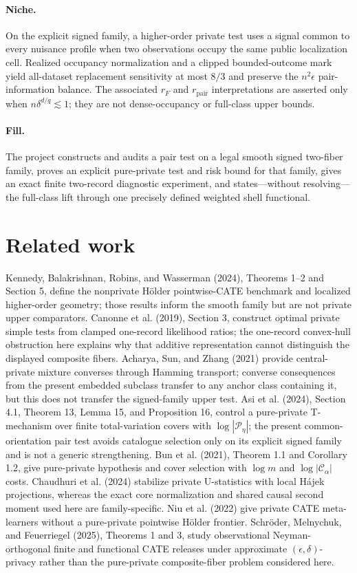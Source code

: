 \documentclass{article}
\begin{document}
\paragraph{Niche.} On the explicit signed family, a higher-order private test uses a signal common to every nuisance profile when two observations occupy the same public localization cell. Realized occupancy normalization and a clipped bounded-outcome mark yield all-dataset replacement sensitivity at most \(8/3\) and preserve the \(n^2\epsilon\) pair-information balance. The associated \(r_F\) and \(r_{\mathrm{pair}}\) interpretations are asserted only when \(n\delta^{d/q}\lesssim1\); they are not dense-occupancy or full-class upper bounds.

\paragraph{Fill.} The project constructs and audits a pair test on a legal smooth signed two-fiber family, proves an explicit pure-private test and risk bound for that family, gives an exact finite two-record diagnostic experiment, and states—without resolving—the full-class lift through one precisely defined weighted shell functional.

\section{Related work}

Kennedy, Balakrishnan, Robins, and Wasserman (2024), Theorems 1--2 and Section 5, define the nonprivate Hölder pointwise-CATE benchmark and localized higher-order geometry; those results inform the smooth family but are not private upper comparators. Canonne et al. (2019), Section 3, construct optimal private simple tests from clamped one-record likelihood ratios; the one-record convex-hull obstruction here explains why that additive representation cannot distinguish the displayed composite fibers. Acharya, Sun, and Zhang (2021) provide central-private mixture converses through Hamming transport; converse consequences from the present embedded subclass transfer to any anchor class containing it, but this does not transfer the signed-family upper test. Asi et al. (2024), Section 4.1, Theorem 13, Lemma 15, and Proposition 16, control a pure-private T-mechanism over finite total-variation covers with \(\log|\mathcal P_\eta|\); the present common-orientation pair test avoids catalogue selection only on its explicit signed family and is not a generic strengthening. Bun et al. (2021), Theorem 1.1 and Corollary 1.2, give pure-private hypothesis and cover selection with \(\log m\) and \(\log|\mathcal C_\alpha|\) costs. Chaudhuri et al. (2024) stabilize private U-statistics with local Hájek projections, whereas the exact core normalization and shared causal second moment used here are family-specific. Niu et al. (2022) give private CATE meta-learners without a pure-private pointwise Hölder frontier. Schröder, Melnychuk, and Feuerriegel (2025), Theorems 1 and 3, study observational Neyman-orthogonal finite and functional CATE releases under approximate \((\epsilon,\delta)\)-privacy rather than the pure-private composite-fiber problem considered here.
\end{document}
